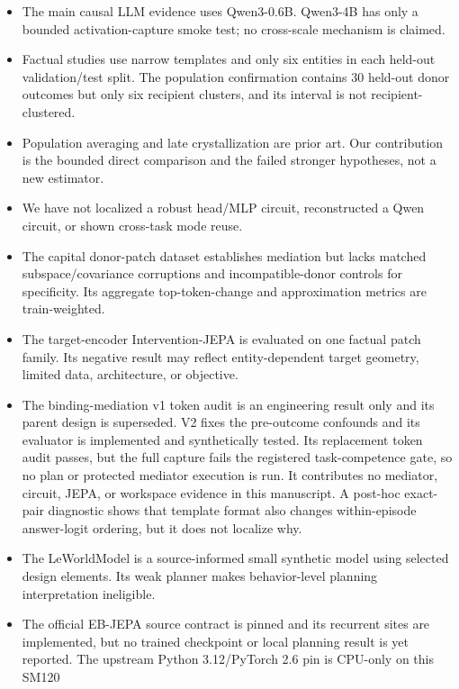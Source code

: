 \documentclass[10pt]{article}
\begin{document}
\begin{itemize}[leftmargin=*]
  \item The main causal LLM evidence uses Qwen3-0.6B.  Qwen3-4B has only a
  bounded activation-capture smoke test; no cross-scale mechanism is claimed.
  \item Factual studies use narrow templates and only six entities in each
  held-out validation/test split.  The population confirmation contains 30
  held-out donor outcomes but only six recipient clusters, and its interval is
  not recipient-clustered.
  \item Population averaging and late crystallization are prior art.  Our
  contribution is the bounded direct comparison and the failed stronger
  hypotheses, not a new estimator.
  \item We have not localized a robust head/MLP circuit, reconstructed a Qwen
  circuit, or shown cross-task mode reuse.
  \item The capital donor-patch dataset establishes mediation but lacks matched
  subspace/covariance corruptions and incompatible-donor controls for
  specificity.  Its aggregate top-token-change and approximation metrics are
  train-weighted.
  \item The target-encoder Intervention-JEPA is evaluated on one factual patch
  family.  Its negative result may reflect entity-dependent target geometry,
  limited data, architecture, or objective.
  \item The binding-mediation v1 token audit is an engineering result only and
  its parent design is superseded.  V2 fixes the pre-outcome confounds and its
  evaluator is implemented and synthetically tested.  Its replacement token
  audit passes, but the full capture fails the registered task-competence gate,
  so no plan or protected mediator execution is run.  It contributes no
  mediator, circuit, JEPA, or workspace evidence in this manuscript.  A
  post-hoc exact-pair diagnostic shows that template format also changes
  within-episode answer-logit ordering, but it does not localize why.
  \item The LeWorldModel is a source-informed small synthetic model using
  selected design elements.  Its weak planner
  makes behavior-level planning interpretation ineligible.
  \item The official EB-JEPA source contract is pinned and its recurrent sites
  are implemented, but no trained checkpoint or local planning result is yet
  reported.  The upstream Python 3.12/PyTorch 2.6 pin is CPU-only on this SM120

\end{itemize}
\end{document}
